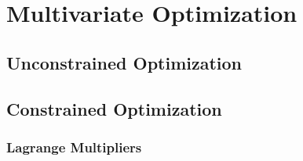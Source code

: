 \section{Multivariate Optimization} 

\subsection{Unconstrained Optimization} 




\subsection{Constrained Optimization} 

\subsubsection{Lagrange Multipliers}

